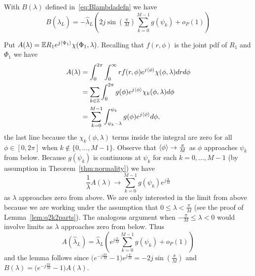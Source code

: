 \documentclass[journal]{IEEEtran}
\begin{document}
\begin{lemma}\label{lem:Blambdaconv}
With $B(\lambda)$ defined in~\eqref{eq:Blambdadefn} we have 
\[
B(\hat{\lambda}_L) = -\hat{\lambda}_L\left(2j\sin(\tfrac{\pi}{M}) \sum_{k=0}^{M-1} g(\psi_k) + o_P(1)\right) 
\]
\end{lemma}
\begin{IEEEproof}
Put $A(\lambda) = {\mathbb E} R_1 e^{j\left\langle \Phi_1 \right\rangle} \chi(\Phi_1,\lambda)$.  Recalling that $f(r,\phi)$ is the joint pdf of $R_1$ and $\Phi_1$ we have
\begin{align*}
 A(\lambda)  &= \int_{0}^{2\pi}\int_{0}^{\infty} r f(r,\phi) e^{j\left\langle \phi \right\rangle}\chi(\phi,\lambda) dr d\phi \\
&= \sum_{k\in{\mathbb Z}}\int_{0}^{2\pi} g(\phi) e^{j\left\langle \phi \right\rangle} \chi_k(\phi,\lambda) d\phi \\
&= \sum_{k=0}^{M-1}\int_{\psi_k-\lambda}^{\psi_k} g(\phi)  e^{j\left\langle \phi \right\rangle} d\phi,
\end{align*}
the last line because the $\chi_k(\phi,\lambda)$ terms inside the integral are zero for all $\phi \in [0,2\pi]$ when $k \notin \{0,\dots,M-1\}$.  Observe that $\left\langle \phi \right\rangle \rightarrow \tfrac{\pi}{M}$ as $\phi$ approaches $\psi_k$ from below.  Because $g(\psi_k)$ is continuous at $\psi_k$ for each $k = 0, \dots, M-1$ (by assumption in Theorem~\ref{thm:normality}) we have 
\[
\frac{1}{\lambda} A(\lambda) \rightarrow \sum_{k=0}^{M-1} g(\psi_k) e^{j\tfrac{\pi}{M}}
\]
as $\lambda$ approaches zero from above.  We are only interested in the limit from above because we are working under the assumption that $0 \leq \lambda < \frac{\pi}{M}$ (see the proof of Lemma~\ref{lem:q2k2parts}).  The analogous argument when $-\tfrac{\pi}{M} \leq \lambda < 0$ would involve limits as $\lambda$ approaches zero from below.  Thus
\[
A(\hat{\lambda}_L) = \hat{\lambda}_L \left(  e^{j\tfrac{\pi}{M}} \sum_{k=0}^{M-1} g(\psi_k) + o_P(1) \right)
\]
and the lemma follows since $\big( e^{-j\tfrac{2\pi}{M}} - 1 \big) e^{j\frac{\pi}{M}} = -2j\sin(\tfrac{\pi}{M})$ and $B(\lambda) = \big( e^{-j\tfrac{2\pi}{M}} - 1 \big)A(\lambda)$.
\end{IEEEproof}
\end{document}
